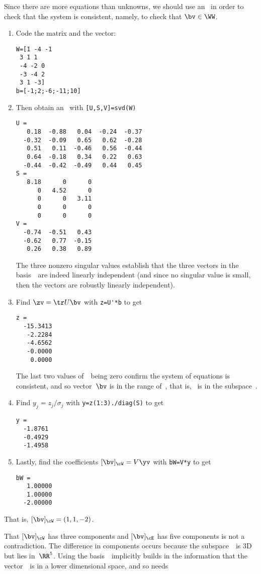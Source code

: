 \begin{example}
\begin{enumerate}
\begin{solution}
Since there are more equations than unknowns, we should use an \svd\ in order to check that the system is consistent, namely, to check that \(\bv\in\WW\).
\begin{enumerate}
\item Code the matrix and the vector:
\begin{verbatim}
W=[1 -4 -1
 3 1 1
 -4 -2 0
 -3 -4 2
 3 1 -3]
b=[-1;2;-6;-11;10]
\end{verbatim}
\setbox\ajrqrbox\hbox{}%
\marginajrbox%
\item Then obtain an \svd\ with \verb|[U,S,V]=svd(W)| \twodp
\begin{verbatim}
U =
   0.18  -0.88   0.04  -0.24  -0.37
  -0.32  -0.09   0.65   0.62  -0.28
   0.51   0.11  -0.46   0.56  -0.44
   0.64  -0.18   0.34   0.22   0.63
  -0.44  -0.42  -0.49   0.44   0.45
S =
   8.18      0      0
      0   4.52      0
      0      0   3.11
      0      0      0
      0      0      0
V =
  -0.74  -0.51   0.43
  -0.62   0.77  -0.15
   0.26   0.38   0.89
\end{verbatim}
The three nonzero singular values establish that the three vectors in the basis~\cW\ are indeed linearly independent (and since no singular value is small, then the vectors are robustly linearly independent).

\item Find \(\zv=\tr U\bv\) with \verb|z=U'*b| to get
\begin{verbatim}
z =
  -15.3413
   -2.2284
   -4.6562
   -0.0000
    0.0000
\end{verbatim}
The last two values of~\zv\ being zero confirm the system of equations is consistent, and so vector~\(\bv\) is in the range of~\cW, that is, \bv~is in the subspace~\WW.

\item Find \(y_j=z_j/\sigma_j\) with \verb|y=z(1:3)./diag(S)| to get
\begin{verbatim}
y =
  -1.8761
  -0.4929
  -1.4958
\end{verbatim}

\item Lastly, find the coefficients \([\bv]_\cW=V\yv\) with \verb|bW=V*y| to get
\begin{verbatim}
bW =
   1.00000
   1.00000
  -2.00000
\end{verbatim}
\end{enumerate}
That is, \([\bv]_\cW=(1,1,-2)\).

That \([\bv]_\cW\) has three components and \([\bv]_\cE\) has five components is not a contradiction.  
The difference in components occurs because the subspace~\WW\ is 3D but lies in~\(\RR^5\).  
Using the basis~\cW\ implicitly builds in the information that the vector~\bv\ is in a lower dimensional space, and so needs 
\end{solution}

\end{enumerate}
\end{example}


